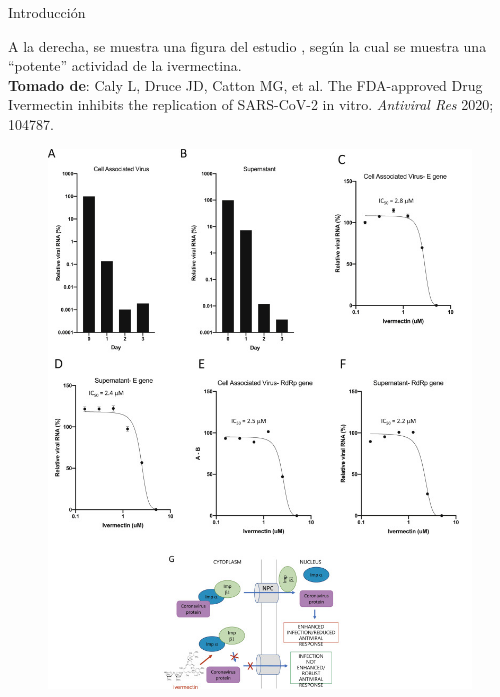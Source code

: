 \documentclass[12pt,xcolor=dvipsnames]{beamer}
\begin{document}
	\begin{frame}{Introducción}
		\begin{multicols}{2}
			
			\scriptsize 
			A la derecha, se muestra una figura del estudio \cite{Caly2020}, según la cual se muestra una ``potente'' actividad de la ivermectina. \\
			\vspace{4em}\scriptsize 
			\textbf{Tomado de}: Caly L, Druce JD, Catton MG, et al. The FDA-approved Drug Ivermectin inhibits the replication of SARS-CoV-2 in vitro. \textit{Antiviral Res} 2020; 104787. 
			\columnbreak
			
			\begin{figure}
				\centering
				\includegraphics[width=1\columnwidth]{figs/Caly_Extracted_Image}
				\label{fig:calyextractedimage}
			\end{figure}	
		\end{multicols}
	\end{frame}
\end{document}
